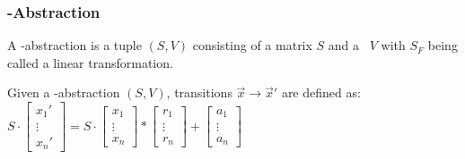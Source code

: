 \begin{frame}
	\frametitle{\qvasr-Abstraction}
	\newcommand{\s}{\ensuremath{\begin{bmatrix} s_x & s_y & s_z \end{bmatrix}}}
	\newcommand{\p}{\ensuremath{\begin{bmatrix} x' \\ y' \\ z' \end{bmatrix}}}
	\newcommand{\up}{\ensuremath{\begin{bmatrix} x \\ y \\ z \end{bmatrix}}}
	\begin{definition}
		A \qvasr-abstraction is a tuple $(S, V)$ consisting of a matrix $S$ and a \qvasr\ $V$ with $S_F$ being called a linear transformation.
	\end{definition}
	\begin{center}
	Given a \qvasr-abstraction $(S, V)$, transitions $\vec{x} \rightarrow \vec{x}'$ are defined as: \\
		$ 
		S \cdot
		\begin{bmatrix}
			x_1' \\
			\vdots \\
			x_n'
		\end{bmatrix}
		=
		S \cdot
		\begin{bmatrix}
			x_1 \\
			\vdots \\
			x_n
		\end{bmatrix}
		*
			\begin{bmatrix}
				r_1 \\
				\vdots \\
				r_n
			\end{bmatrix}
		+
		\begin{bmatrix}
			a_1 \\
			\vdots \\
			a_n
		\end{bmatrix}	
		$
	\end{center}
\end{frame}


